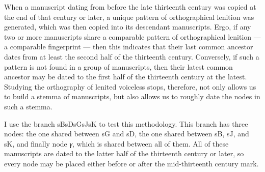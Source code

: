 When a manuscript dating from before the late thirteenth century was copied at the end of that century or later, a unique pattern of orthographical lenition  was generated, which was then copied into its descendant manuscripts.
Ergo, if any two or more manuscripts share a comparable pattern of orthographical lenition --- a comparable fingerprint --- then this indicates that their last common ancestor dates from at least the second half of the thirteenth century. Conversely, if such a pattern is not found in a group of manuscripts, then their latest common ancestor may be dated to the first half of the thirteenth century at the latest. Studying the orthography of lenited voiceless stops, therefore, not only allows us to build a stemma of manuscripts, but also allows us to roughly date the nodes in such a stemma.


I use the branch \gls{sB}\gls{sD}\gls{sG}\gls{sJ}\gls{sK}
to  test this methodology. This branch has three nodes: the one shared between \gls{sG} and \gls{sD}, the one shared between \gls{sB}, \gls{sJ}, and \gls{sK}, and finally node \textit{γ}, which is shared between all of them. All of these manuscripts are dated to the latter half of the thirteenth century or later, so every node may be placed either before or after the mid-thirteenth century mark.

